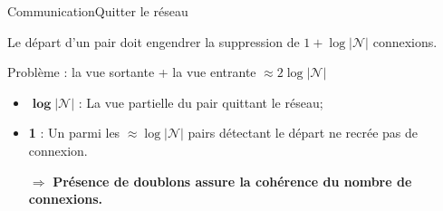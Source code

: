 \begin{frame}{Communication}{Quitter le réseau}

  Le départ d'un pair doit engendrer la suppression de $1+\log|\mathcal{N}|$ connexions.

  \vspace{0.5cm}

  Problème : la vue sortante + la vue entrante $\approx 2\log|\mathcal{N}|$
  \begin{itemize}
  \item $\pmb{\log|\mathcal{N}|}$ : La vue partielle du pair quittant le réseau;
  \item \textbf{1} : Un parmi les $\approx \log|\mathcal{N}|$ pairs détectant
    le départ ne recrée pas de connexion.
  \end{itemize}

  \vspace{0.5cm}\hspace{-1cm}
  \begin{minipage}{0.32\textwidth}
    \begin{center}
      
    \end{center}
  \end{minipage}
  \hspace{0.45cm}
  \begin{minipage}{0.32\textwidth}
    \begin{center}
      
    \end{center}
  \end{minipage}
  \hspace{0.45cm}
  \begin{minipage}{0.32\textwidth}
    \begin{center}
      
    \end{center}
  \end{minipage}

  \vspace{1cm}
  \large
  \begin{itemize}
  \item [$\Rightarrow$] \textbf{Présence de doublons assure la cohérence du
      nombre de connexions.}
  \end{itemize}
 
\end{frame}



